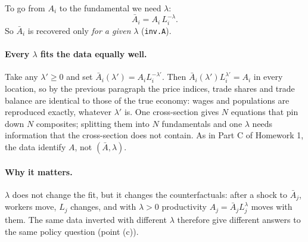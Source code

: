 \documentclass[11pt,a4paper]{article}
\begin{document}
To go from $A_i$ to the fundamental we need $\lambda$:
\begin{equation}
\bar A_i = A_i\,L_i^{-\lambda}.
\end{equation}
So $\bar A_i$ is recovered only \emph{for a given} $\lambda$ (\texttt{inv.A}).

\paragraph{Every $\lambda$ fits the data equally well.} Take any $\lambda' \ge 0$ and set $\bar A_i(\lambda') = A_iL_i^{-\lambda'}$. Then $\bar A_i(\lambda')L_i^{\lambda'} = A_i$ in every location, so by the previous paragraph the price indices, trade shares and trade balance are identical to those of the true economy: wages and populations are reproduced exactly, whatever $\lambda'$ is. One cross-section gives $N$ equations that pin down $N$ composites; splitting them into $N$ fundamentals and one $\lambda$ needs information that the cross-section does not contain. As in Part C of Homework 1, the data identify $A$, not $(\bar A, \lambda)$.

\paragraph{Why it matters.} $\lambda$ does not change the fit, but it changes the counterfactuals: after a shock to $\bar A_j$, workers move, $L_j$ changes, and with $\lambda > 0$ productivity $A_j = \bar A_jL_j^{\lambda}$ moves with them. The same data inverted with different $\lambda$ therefore give different answers to the same policy question (point (c)).
\end{document}
